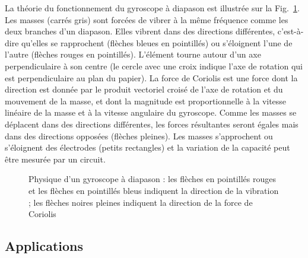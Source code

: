 La théorie du fonctionnement du gyroscope à diapason est illustrée sur la Fig.~\ref{fig.tuning-gyro}. Les masses (carrés gris) sont forcées de vibrer à la même fréquence comme les deux branches d'un diapason. Elles vibrent dans des directions différentes, c'est-à-dire qu'elles se rapprochent (flèches bleues en pointillés) ou s'éloignent l'une de l'autre (flèches rouges en pointillés). L'élément tourne autour d'un axe perpendiculaire à son centre (le cercle avec une croix indique l'axe de rotation qui est perpendiculaire au plan du papier). La force de Coriolis est une force dont la direction est donnée par le produit vectoriel croisé de l'axe de rotation et du mouvement de la masse, et dont la magnitude est proportionnelle à la vitesse linéaire de la masse et à la vitesse angulaire du gyroscope. Comme les masses se déplacent dans des directions différentes, les forces résultantes seront égales mais dans des directions opposées (flèches pleines). Les masses s'approchent ou s'éloignent des électrodes (petits rectangles) et la variation de la capacité peut être mesurée par un circuit.

\begin{figure}
\begin{center}
\end{center}
\caption{Physique d'un gyroscope à diapason : les flèches en pointillés rouges et les flèches en pointillés bleus indiquent la direction de la vibration ; les flèches noires pleines indiquent la direction de la force de Coriolis}\label{fig.tuning-gyro}
\end{figure}

\subsection{Applications}

